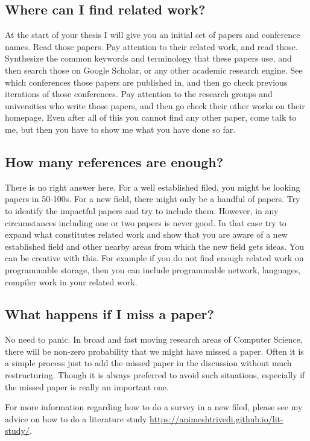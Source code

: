 \documentclass[11pt]{article}
\begin{document}
\subsection*{Where can I find related work?}
At the start of your thesis I will give you an initial set of papers and conference names. Read those papers. Pay attention to their related work, and read those. Synthesize the common keywords and terminology that these papers use, and then search those on Google Scholar, or any other academic research engine. See which conferences those papers are published in, and then go check previous iterations of those conferences. Pay attention to the research groups and universities who write those papers, and then go check their other works on their homepage. Even after all of this you cannot find any other paper, come talk to me, but then you have to show me what you have done so far. 

\subsection*{How many references are enough?}
There is no right answer here. For a well established filed, you might be looking papers in 50-100s. For a new field, there might only be a handful of papers. Try to identify the impactful papers and try to include them. However, in any circumstances including one or two papers is never good. In that case try to expand what constitutes related work and show that you are aware of a new established field and other nearby areas from which the new field gets ideas. You can be creative with this. For example if you do not find enough related work on programmable storage, then you can include programmable network, languages, compiler work in your related work. 


\subsection*{What happens if I miss a paper?}
No need to panic. In broad and fast moving research areas of Computer Science, there will be non-zero probability that we might have missed a paper. Often it is a simple process just to add the missed paper in the discussion without much restructuring. Though it is always preferred to avoid such situations, especially if the missed paper is really an important one. 

For more information regarding how to do a survey in a new filed, please see my advice on how to do a literature study \url{https://animeshtrivedi.github.io/lit-study/}. 
\end{document}
